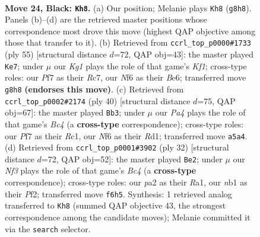 \documentclass[11pt]{article}
\begin{document}
\clearpage

\begin{figure}[p]\centering
\begin{subfigure}{0.46\textwidth}\centering
\resizebox{\linewidth}{!}{%
\newchessgame
\chessboard[
  setfen={5rk1/4rppp/1nb1pn2/p1N5/6P1/1P2P3/P4RPP/RN1B2K1 b - - 2 24},
  showmover=false,
  pgfstyle=straightmove, color=movearrow, markmove={g8-h8}
]}
\caption{}
\end{subfigure}\hfill
\begin{subfigure}{0.46\textwidth}\centering
\resizebox{\linewidth}{!}{%
\newchessgame
\chessboard[
  setfen={3r1k2/2r2pp1/p3b2p/1p1pP3/2nN2P1/3R3P/PPP1R3/1K3B2 b - - 9 28},
  showmover=false,
  pgfstyle=straightmove, color=movearrow, markmove={f8-e7}
]}
\caption{}
\end{subfigure}
\\[4pt]
\begin{subfigure}{0.46\textwidth}\centering
\resizebox{\linewidth}{!}{%
\newchessgame
\chessboard[
  setfen={r1b5/3nr1kp/1pp2ppn/4p3/N1B1P3/5N2/PP3PPP/2RR2K1 w - - 0 21},
  showmover=false,
  pgfstyle=straightmove, color=movearrow, markmove={c4-b3}
]}
\caption{}
\end{subfigure}\hfill
\begin{subfigure}{0.46\textwidth}\centering
\resizebox{\linewidth}{!}{%
\newchessgame
\chessboard[
  setfen={r1b3k1/ppr1bppp/4p3/4N2n/2B5/2N1P3/PP3PPP/R4RK1 w - - 1 17},
  showmover=false,
  pgfstyle=straightmove, color=movearrow, markmove={c4-e2}
]}
\caption{}
\end{subfigure}
\caption{\textbf{Move 24, Black: \texttt{Kh8}.} (a) Our position; Melanie plays \texttt{Kh8} (\texttt{g8h8}). Panels (b)--(d) are the retrieved master positions whose correspondence most drove this move (highest QAP objective among those that transfer to it). (b) Retrieved from \texttt{ccrl\_top\_p0000\#1733} (ply 55) [structural distance $d$=72, QAP obj=43]: the master played \texttt{Ke7}; under $\mu$ our \emph{Kg1} plays the role of that game's \emph{Kf1}; cross-type roles: our \emph{P}f7 as their \emph{R}c7, our \emph{N}f6 as their \emph{B}e6; transferred move \texttt{g8h8} \textbf{(endorses this move)}. (c) Retrieved from \texttt{ccrl\_top\_p0002\#2174} (ply 40) [structural distance $d$=75, QAP obj=67]: the master played \texttt{Bb3}; under $\mu$ our \emph{Pa4} plays the role of that game's \emph{Bc4} (a \textbf{cross-type} correspondence); cross-type roles: our \emph{P}f7 as their \emph{R}c1, our \emph{N}f6 as their \emph{R}d1; transferred move \texttt{a5a4}. (d) Retrieved from \texttt{ccrl\_top\_p0001\#3902} (ply 32) [structural distance $d$=72, QAP obj=52]: the master played \texttt{Be2}; under $\mu$ our \emph{Nf3} plays the role of that game's \emph{Bc4} (a \textbf{cross-type} correspondence); cross-type roles: our \emph{p}a2 as their \emph{R}a1, our \emph{n}b1 as their \emph{P}f2; transferred move \texttt{f6h5}. Synthesis: 1 retrieved analog transferred to \texttt{Kh8} (summed QAP objective 43, the strongest correspondence among the candidate moves); Melanie committed it via the \texttt{search} selector.}
\label{fig:thought-m47}
\end{figure}
\end{document}
